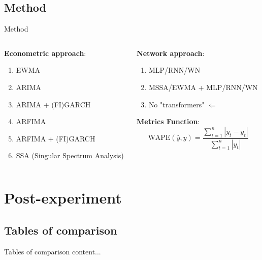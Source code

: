 \documentclass[11pt, aspectratio= 169]{beamer}
\begin{document}
	
	\subsection{Method}
	\begin{frame}{Method}
		\begin{columns}
			\begin{column}{0.5\textwidth}
				\textbf{Econometric approach}:
				\begin{center}
					\begin{enumerate}
						\item EWMA
						\item ARIMA
						\item ARIMA + (FI)GARCH
						\item ARFIMA
						\item ARFIMA + (FI)GARCH
						\item SSA (Singular Spectrum Analysis)
					\end{enumerate}
				\end{center}
			\end{column}
			\hfill
			\begin{column}{0.5\textwidth}
				\textbf{Network approach}:
				\begin{center}
					\begin{enumerate}
						\item MLP/RNN/WN
						\item MSSA/EWMA + MLP/RNN/WN
						\item No "transformers" $\Leftarrow$ \cite{zeng2022transformers}
					\end{enumerate}
				\end{center}
				\textbf{Metrics Function}:
				\begin{equation}
					\text{WAPE}(\hat{y}, y) = \frac{\sum_{t= 1}^n |y_t - \hat{y}_t|}{\sum_{t= 1}^n |y_t|}
				\end{equation}
			\end{column}
		\end{columns}
	\end{frame}
	
	\section{Post-experiment}
	\subsection{Tables of comparison}
	\begin{frame}{Tables of comparison}
		content...
	\end{frame}
	
\end{document}
